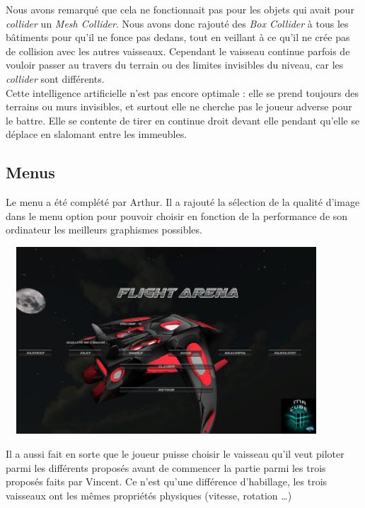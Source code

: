 \documentclass[10pt, titlepage]{report}
\begin{document}
Nous avons remarqué que cela ne fonctionnait pas pour les objets qui avait pour \textit{collider} un\textit{ Mesh Collider}. Nous avons donc rajouté des \textit{Box Collider} à tous les bâtiments pour qu'il ne fonce pas dedans, tout en veillant à ce qu'il ne crée pas de collision avec les autres vaisseaux. Cependant le vaisseau continue parfois de vouloir passer au travers du terrain ou des limites invisibles du niveau, car les \textit{collider} sont différents.\\

Cette intelligence artificielle n'est pas encore optimale : elle se prend toujours des terrains ou murs invisibles, et surtout elle ne cherche pas le joueur adverse pour le battre. Elle se contente de tirer en continue droit devant elle pendant qu'elle se déplace en slalomant entre les immeubles.\\

\subsection{Menus}

Le menu a été complété par Arthur. Il a rajouté la sélection de la qualité d'image dans le menu option pour pouvoir choisir en fonction de la performance de son ordinateur les meilleurs graphismes possibles.\\

\begin{center}
\includegraphics[height=7cm, width=12cm]{menu_option.jpg}
\end{center}

Il a aussi fait en sorte que le joueur puisse choisir le vaisseau qu'il veut piloter parmi les différents proposés avant de commencer la partie parmi les trois proposés faits par Vincent. Ce n'est qu'une différence d'habillage, les trois vaisseaux ont les mêmes propriétés physiques (vitesse, rotation \dots )\\
\end{document}
